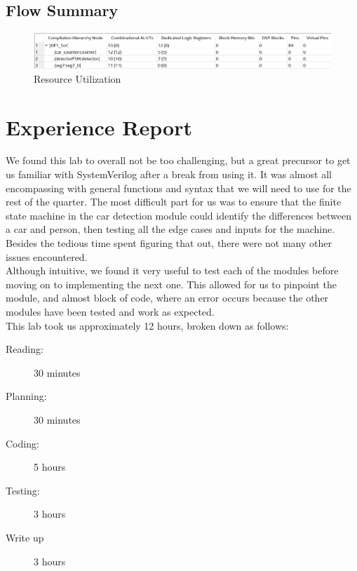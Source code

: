 \documentclass[11pt, titlepage]{article}
\begin{document}
        \subsection{Flow Summary}
            \begin{figure}[!htb]
                \centering
                \captionsetup{justification=centering}
                
                \includegraphics[scale=0.69]{Images/resource utilization.png}
                
                \caption{Resource Utilization}
            \end{figure} 
            
    \section{Experience Report}
        We found this lab to overall not be too challenging, but a great precursor to get us familiar with SystemVerilog after a break from using it. It was almost all encompassing with general functions and syntax that we will need to use for the rest of the quarter. The most difficult part for us was to ensure that the finite state machine in the car detection module could identify the differences between a car and person, then testing all the edge cases and inputs for the machine. Besides the tedious time spent figuring that out, there were not many other issues encountered.\\
        Although intuitive, we found it very useful to test each of the modules before moving on to implementing the next one. This allowed for us to pinpoint the module, and almost block of code, where an error occurs because the other modules have been tested and work as expected. \\
        This lab took us approximately 12 hours, broken down as follows:
        \begin{description}
            \item[Reading:] 30 minutes
            \item[Planning:] 30 minutes
            \item[Coding:] 5 hours
            \item[Testing:] 3 hours
            \item[Write up] 3 hours
        \end{description}        
    
\end{document}
